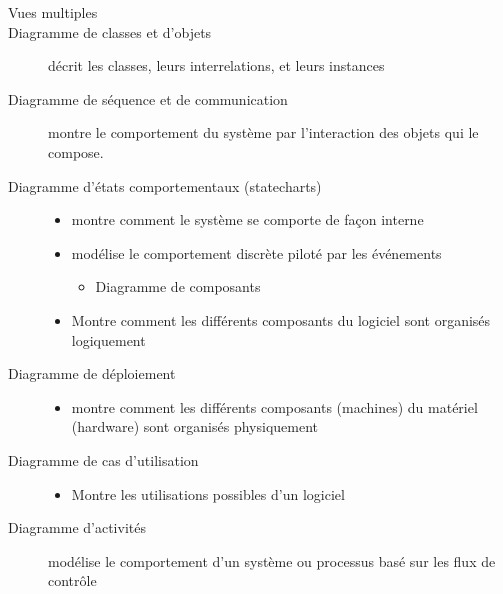 \begin{description}
    \item[Vues multiples]
    \item[Diagramme de classes et d'objets] décrit les classes, leurs interrelations, et leurs instances
    \item[Diagramme de séquence et de communication] montre le comportement du système par l’interaction des objets qui le compose.
    \item[Diagramme d’états comportementaux (statecharts)]
    \begin{itemize}
        \item montre comment le système se comporte de façon interne
        \item modélise le comportement discrète piloté par les événements
        \begin{itemize}
            \item Diagramme de composants
        \end{itemize}
        \item Montre comment les différents composants du logiciel sont organisés logiquement
    \end{itemize}
    \item[Diagramme de déploiement]
    \begin{itemize}
        \item montre comment les différents composants (machines) du matériel
(hardware) sont organisés physiquement
    \end{itemize}
    \item[Diagramme de cas d'utilisation]
    \begin{itemize}
        \item Montre les utilisations possibles d'un logiciel
    \end{itemize}
    \item[Diagramme d'activités]modélise le comportement d’un système ou processus basé sur les flux de contrôle
\end{description}
